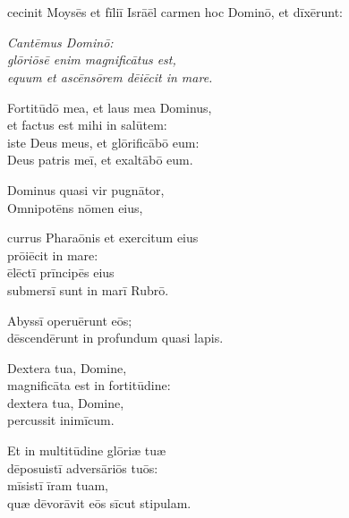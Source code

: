 \chapter{}


\thispagestyle{empty}

 cecinit Moysēs et fīliī Isrāēl
carmen hoc Dominō, et dīxērunt:
\begin{flushleft}
{\it
    Cantēmus Dominō:\\
    glōriōsē enim magnificātus est,\\
    equum et ascēnsōrem dēiēcit in mare.

    Fortitūdō mea, et laus mea Dominus,\\
    et factus est mihi in salūtem:\\
    iste Deus meus, et glōrificābō eum:\\
    Deus patris meī, et exaltābō eum.

    Dominus quasi vir pugnātor,\\
    Omnipotēns nōmen eius,

    currus Pharaōnis et exercitum eius\\
    prōiēcit in mare:\\
    ēlēctī prīncipēs eius\\
    submersī sunt in marī Rubrō.

    Abyssī operuērunt eōs;\\
    dēscendērunt in profundum quasi lapis.

    Dextera tua, Domine,\\
    magnificāta est in fortitūdine:\\
    dextera tua, Domine,\\
    percussit inimīcum.

    Et in multitūdine glōriæ tuæ\\
    dēposuistī adversāriōs tuōs:\\
    mīsistī īram tuam,\\
    quæ dēvorāvit eōs sīcut stipulam.

}
\end{flushleft}
